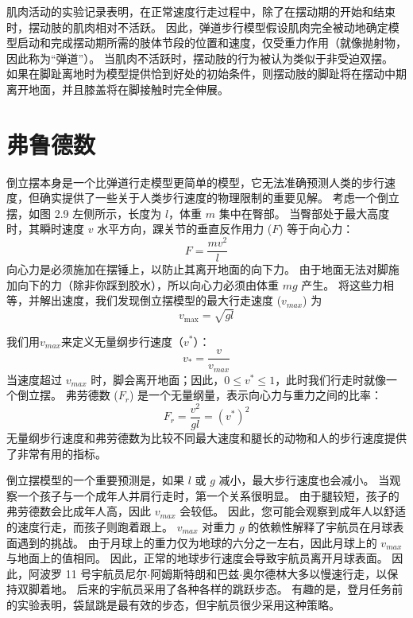 肌肉活动的实验记录表明，在正常速度行走过程中，除了在摆动期的开始和结束时，摆动肢的肌肉相对不活跃。
因此，弹道步行模型假设肌肉完全被动地确定模型启动和完成摆动期所需的肢体节段的位置和速度，仅受重力作用（就像抛射物，因此称为“弹道”）。
当肌肉不活跃时，摆动肢的行为被认为类似于非受迫双摆。
如果在脚趾离地时为模型提供恰到好处的初始条件，则摆动肢的脚趾将在摆动中期离开地面，并且膝盖将在脚接触时完全伸展。


\section{弗鲁德数}

倒立摆本身是一个比弹道行走模型更简单的模型，它无法准确预测人类的步行速度，但确实提供了一些关于人类步行速度的物理限制的重要见解。
考虑一个倒立摆，如图 2.9 左侧所示，长度为 $l$，体重 $m$ 集中在臀部。
当臀部处于最大高度时，其瞬时速度 $v$ 水平方向，踝关节的垂直反作用力 ($F$) 等于向心力：
%
\begin{equation}
	F = \frac{m v^2}{l}
\end{equation}
% 
向心力是必须施加在摆锤上，以防止其离开地面的向下力。
由于地面无法对脚施加向下的力（除非你踩到胶水），所以向心力必须由体重 $mg$ 产生。
将这些力相等，并解出速度，我们发现倒立摆模型的最大行走速度 ($v_{max}$) 为
%
\begin{equation}
	v_{\text{max}} = \sqrt{g l}
\end{equation}

我们用$v_{max}$来定义无量纲步行速度（$v^{*}$）：
\begin{equation}
	v_{*} = \frac{v}{v_{max}}
\end{equation}
%
当速度超过 $v_{max}$ 时，脚会离开地面；因此，$0 \leq v^{*} \leq 1$，此时我们行走时就像一个倒立摆。
弗劳德数 ($F_r$) 是一个无量纲量，表示向心力与重力之间的比率：
%
\begin{equation}
	F_r = \frac{v^2}{g l}
		= (v^{*})^2
\end{equation}
%
无量纲步行速度和弗劳德数为比较不同最大速度和腿长的动物和人的步行速度提供了非常有用的指标。


倒立摆模型的一个重要预测是，如果 $l$ 或 $g$ 减小，最大步行速度也会减小。
当观察一个孩子与一个成年人并肩行走时，第一个关系很明显。
由于腿较短，孩子的弗劳德数会比成年人高，因此 $v_{max}$ 会较低。
因此，您可能会观察到成年人以舒适的速度行走，而孩子则跑着跟上。 
$v_{max}$ 对重力 $g$ 的依赖性解释了宇航员在月球表面遇到的挑战。
由于月球上的重力仅为地球的六分之一左右，因此月球上的 $v_{max}$ 与地面上的值相同。
因此，正常的地球步行速度会导致宇航员离开月球表面。
因此，阿波罗 11 号宇航员尼尔$\cdot$阿姆斯特朗和巴兹$\cdot$奥尔德林大多以慢速行走，以保持双脚着地。
后来的宇航员采用了各种各样的跳跃步态。
有趣的是，登月任务前的实验表明，袋鼠跳是最有效的步态，但宇航员很少采用这种策略。



